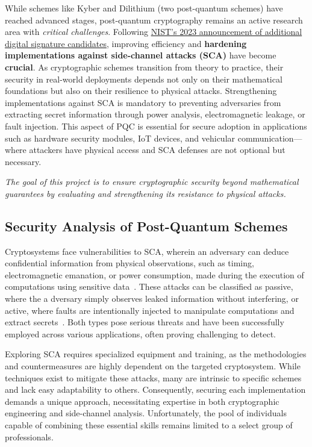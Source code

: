 \documentclass[11pt, a4paper]{article}
\begin{document}
While schemes like Kyber and Dilithium (two post-quantum schemes) have reached advanced stages, post-quantum cryptography 
remains an active research area with \emph{critical challenges}. Following \href{https://www.nist.gov/news-events/news/2023/07/nist-announces-additional-digital-signature-candidates-pqc-standardization}
{NIST's 2023 announcement of additional digital signature candidates}, 
improving efficiency and \textbf{hardening implementations against 
side-channel attacks (SCA)} have become \textbf{crucial}. As cryptographic schemes transition from 
theory to practice, their security in real-world deployments depends not only on their mathematical 
foundations but also on their resilience to physical attacks. Strengthening implementations against 
SCA is mandatory to preventing adversaries from extracting secret information through power analysis, 
electromagnetic leakage, or fault injection. This aspect of PQC is essential for secure adoption in 
applications such as hardware security modules, IoT devices, and vehicular communication—where 
attackers have physical access and SCA defenses are not optional but necessary. 

\emph{The goal of this project is to ensure cryptographic security beyond mathematical 
guarantees by evaluating and strengthening its resistance to physical attacks.}

\subsection*{Security Analysis of Post-Quantum Schemes}\label{sec:an}\vspace{-0.1cm}

Cryptosystems face vulnerabilities to SCA, wherein an adversary can deduce 
confidential information from physical observations, such as timing,
electromagnetic emanation, or power consumption, made during the execution of 
computations using sensitive data~\cite{brumley2005remote, KocherJJR11,10.1007/3-540-48405-1_25}.
These attacks can be classified as passive, where the a
dversary simply observes leaked information without interfering, or active, 
where faults are intentionally injected to manipulate computations and extract 
secrets~\cite{4599557,6076462}. Both types pose serious threats and have been successfully employed 
across various applications, often proving challenging to detect.

Exploring SCA requires specialized equipment and training, as the 
methodologies and countermeasures are highly dependent on the targeted 
cryptosystem. While techniques exist to mitigate these attacks, many are 
intrinsic to specific schemes and lack easy adaptability to others. Consequently, 
securing each implementation demands a unique approach, necessitating 
expertise in both cryptographic engineering and side-channel analysis. 
Unfortunately, the pool of individuals capable of combining these
essential skills remains limited to a select group of professionals.
\end{document}
